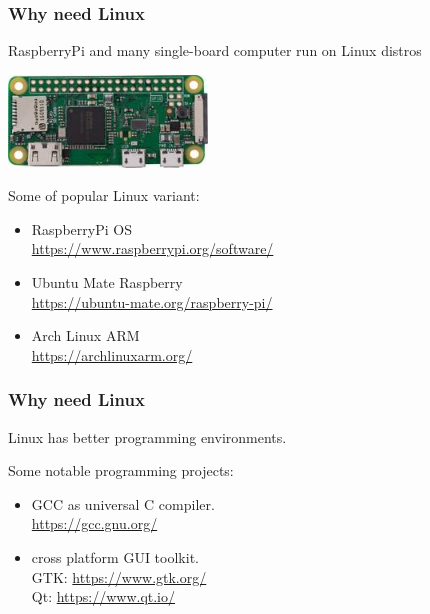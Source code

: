 \documentclass[table,dvipsnames]{beamer}
\begin{document}
	\begin{frame}
		\frametitle{Why need Linux}
		\begin{exampleblock}{}
			RaspberryPi and many single-board computer run on Linux distros
			\begin{center}
				\includegraphics[width=150pt]{images/rpizerow}
			\end{center}
		\end{exampleblock}
		\begin{exampleblock}{}
			Some of popular Linux variant:
			\begin{itemize}
				\item RaspberryPi OS \\
				\url{https://www.raspberrypi.org/software/}
				
				\item Ubuntu Mate Raspberry \\
				\url{https://ubuntu-mate.org/raspberry-pi/}
				
				\item Arch Linux ARM \\
				\url{https://archlinuxarm.org/}
			\end{itemize}
		\end{exampleblock}
	\end{frame}

	\begin{frame}
		\frametitle{Why need Linux}
		\begin{exampleblock}{}
			Linux has better programming environments.
		\end{exampleblock}
		\begin{exampleblock}{}
			Some notable programming projects:
			\begin{itemize}
				\item GCC as universal C compiler.\\
				\url{https://gcc.gnu.org/}
				
				\item cross platform GUI toolkit.\\
				GTK: \url{https://www.gtk.org/}\\
				Qt: \url{https://www.qt.io/}
			\end{itemize}
		\end{exampleblock}
	\end{frame}
\end{document}
